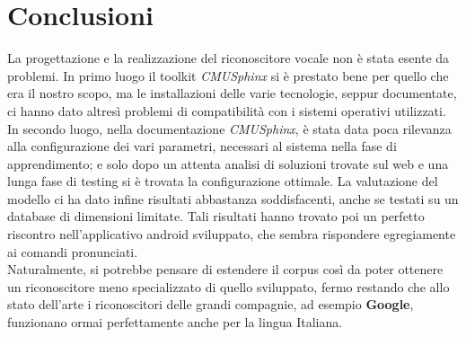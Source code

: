 \documentclass[12pt]{article}
\begin{document}
\section{Conclusioni}
    La progettazione e la realizzazione del riconoscitore vocale non è stata esente da problemi. In primo luogo il toolkit \textit{CMUSphinx} si è prestato bene per quello che era il nostro scopo, ma le installazioni delle varie tecnologie, seppur documentate, ci hanno dato altresì problemi di compatibilità con i sistemi operativi utilizzati. In secondo luogo, nella documentazione \textit{CMUSphinx}, è stata data poca rilevanza alla configurazione dei vari parametri, necessari al sistema nella fase di apprendimento; e solo dopo un attenta analisi di soluzioni trovate sul web e una lunga fase di testing si è trovata la configurazione ottimale. La valutazione del modello ci ha dato infine risultati abbastanza soddisfacenti, anche se testati su un database di dimensioni limitate. Tali risultati hanno trovato poi un perfetto riscontro nell'applicativo android sviluppato, che sembra rispondere egregiamente ai comandi pronunciati.\\
    Naturalmente, si potrebbe pensare di estendere il corpus così da poter ottenere un riconoscitore meno specializzato di quello sviluppato, fermo restando che allo stato dell'arte i riconoscitori delle grandi compagnie, ad esempio \textbf{Google}, funzionano ormai perfettamente anche per la lingua Italiana. 
    
\clearpage\null\thispagestyle{empty}
\nocite{*} 


\end{document}
